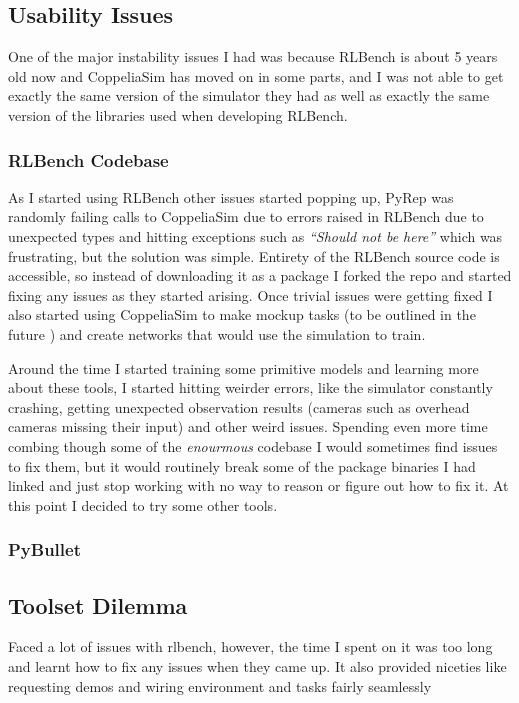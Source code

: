 \subsection{Usability Issues}
One of the major instability issues I had was because RLBench is about 5 years old now and CoppeliaSim has moved on in some parts, and I was not able to get exactly the same version of the simulator they had as well as exactly the same version of the libraries used when developing RLBench.

\subsubsection{RLBench Codebase}
As I started using RLBench other issues started popping up, PyRep was randomly failing calls to CoppeliaSim due to errors raised in RLBench due to unexpected types and hitting exceptions such as \emph{``Should not be here''} which was frustrating, but the solution was simple. Entirety of the RLBench source code is accessible, so instead of downloading it as a package I forked the repo and started fixing any issues as they started arising. Once trivial issues were getting fixed I also started using CoppeliaSim to make mockup tasks (to be outlined in the future ) and create networks that would use the simulation to train.

Around the time I started training some primitive models and learning more about these tools, I started hitting weirder errors, like the simulator constantly crashing, getting unexpected observation results (cameras such as overhead cameras  missing their input) and other weird issues. Spending even more time combing though some of the \emph{enourmous} codebase I would sometimes find issues to fix them, but it would routinely break some of the package binaries I had linked and just stop working with no way to reason or figure out how to fix it. At this point I decided to try some other tools.

\subsubsection{PyBullet}

\subsection{Toolset Dilemma}
Faced a lot of issues with rlbench, however, the time I spent on it was too long and learnt how to fix any issues when they came up. It also provided niceties like requesting demos and wiring environment and tasks fairly seamlessly

